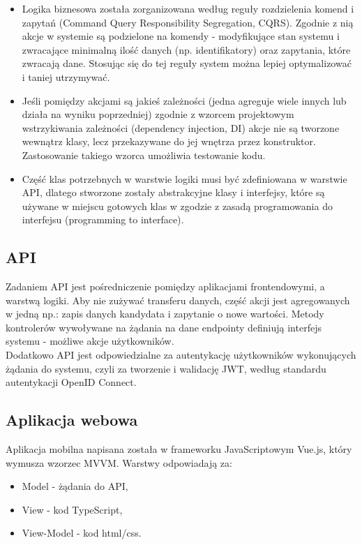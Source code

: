 \documentclass{article}
\begin{document}
\begin{itemize}
    \item Logika biznesowa została zorganizowana według reguły rozdzielenia komend i zapytań (Command Query Responsibility Segregation, CQRS). Zgodnie z nią akcje w systemie są podzielone na komendy - modyfikujące stan systemu i zwracające minimalną ilość danych (np. identifikatory) oraz zapytania, które zwracają dane. Stosując się do tej reguły system można lepiej optymalizować i taniej utrzymywać.
    \item Jeśli pomiędzy akcjami są jakieś zależności (jedna agreguje wiele innych lub działa na wyniku poprzedniej) zgodnie z wzorcem projektowym wstrzykiwania zależności (dependency injection, DI) akcje nie są tworzone wewnątrz klasy, lecz przekazywane do jej wnętrza przez konstruktor. Zastosowanie takiego wzorca umożliwia testowanie kodu.
    \item Część klas potrzebnych w warstwie logiki musi być zdefiniowana w warstwie API, dlatego stworzone zostały abstrakcyjne klasy i interfejsy, które są używane w miejscu gotowych klas w zgodzie z zasadą programowania do interfejsu (programming to interface). 
\end{itemize}
\subsection{API}
Zadaniem API jest pośredniczenie pomiędzy aplikacjami frontendowymi, a warstwą logiki. Aby nie zużywać transferu danych, część akcji jest agregowanych w jedną np.: zapis danych kandydata i zapytanie o nowe wartości. Metody kontrolerów wywoływane na żądania na dane endpointy definiują interfejs systemu - możliwe akcje użytkowników.\\
Dodatkowo API jest odpowiedzialne za autentykację użytkowników wykonujących żądania do systemu, czyli za tworzenie i walidację JWT, według standardu autentykacji OpenID Connect.
\subsection{Aplikacja webowa}
Aplikacja mobilna napisana została w frameworku JavaScriptowym Vue.js, który wymusza wzorzec MVVM. Warstwy odpowiadają za:
\begin{itemize}
    \item Model - żądania do API, 
    \item View - kod TypeScript,
    \item View-Model - kod html/css.
\end{itemize}
\end{document}
